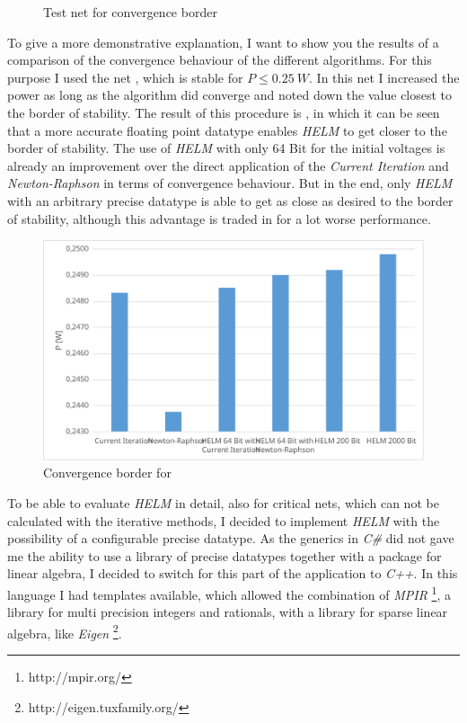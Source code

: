 \begin{figure}
	\centering
	
	\caption{Test net for convergence border}
	\label{fig:convergence_border_net}
\end{figure}

To give a more demonstrative explanation, I want to show you the results of a comparison of the convergence behaviour of the different algorithms. For this purpose I used the net , which is stable for $P \le \SI{0.25}{W}$. In this net I increased the power as long as the algorithm did converge and noted down the value closest to the border of stability. The result of this procedure is , in which it can be seen that a more accurate floating point datatype enables \emph{HELM} to get closer to the border of stability. The use of \emph{HELM} with only 64 Bit for the initial voltages is already an improvement over the direct application of the \emph{Current Iteration} and \emph{Newton-Raphson} in terms of convergence behaviour. But in the end, only \emph{HELM} with an arbitrary precise datatype is able to get as close as desired to the border of stability, although this advantage is traded in for a lot worse performance.

\begin{figure}
	\centering
	\includegraphics[scale=0.7]{figures/convergence_border}
	\caption{Convergence border for }
	\label{fig:convergence_border}
\end{figure}

To be able to evaluate \emph{HELM} in detail, also for critical nets, which can not be calculated with the iterative methods, I decided to implement \emph{HELM} with the possibility of a configurable precise datatype. As the generics in \emph{C\#} did not gave me the ability to use a library of precise datatypes together with a package for linear algebra, I decided to switch for this part of the application to \emph{C++}. In this language I had templates available, which allowed the combination of \emph{MPIR} \footnote{http://mpir.org/}, a library for multi precision integers and rationals, with a library for sparse linear algebra, like \emph{Eigen} \footnote{http://eigen.tuxfamily.org/}.

